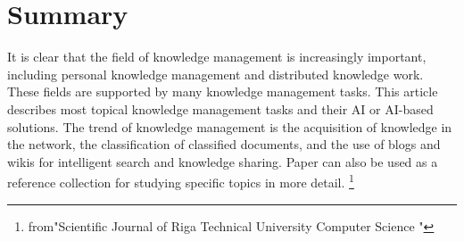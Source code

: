\documentclass[a4paper,12pt]{article}
\begin{document}
\section{Summary}
	It is clear that the field of knowledge management is increasingly important, including personal knowledge management and distributed knowledge work. These fields are supported by many knowledge management tasks. This article describes most topical knowledge management tasks and their AI or AI-based solutions. The trend of knowledge management is the acquisition of knowledge in the network, the classification of classified documents, and the use of blogs and wikis for intelligent search and knowledge sharing. Paper can also be used as a reference collection for studying specific topics in more detail.
	\footnote{from"Scientific Journal of Riga Technical University Computer Science	"} 

  
%
 
   
\end{document}
